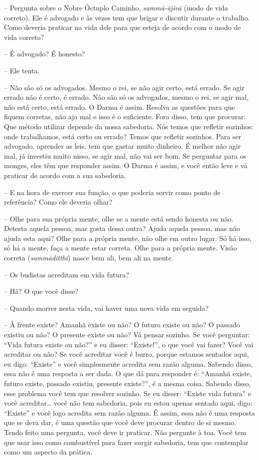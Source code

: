 -- Pergunta sobre o Nobre Óctuplo Caminho,
\textit{sammā-ājivā} (modo de vida correto). Ele é advogado e às
vezes tem que brigar e discutir durante o trabalho. Como deveria
praticar na vida dele para que esteja de acordo com o modo de vida
correto?

-- É advogado? É honesto?

-- Ele tenta.

-- Não são só os advogados. Mesmo o rei, se não agir certo, está
errado. Se agir errado não é certo, é errado. Não são só os advogados,
mesmo o rei, se agir mal, não está certo, está errado. O Darma é assim.
Resolva as questões para que fiquem corretas, não aja mal e isso é o
suficiente. Fora disso, tem que procurar. Que método utilizar depende
da nossa sabedoria. Nós temos que refletir sozinhos: onde trabalhamos,
está certo ou errado? Temos que refletir sozinhos. Para ser advogado,
aprender as leis, tem que gastar muito dinheiro. É melhor não agir mal,
já investiu muito nisso, se agir mal, não vai ser bom. Se perguntar
para os monges, eles têm que responder assim. O Darma é assim, e você
então leve e vá praticar de acordo com a sua sabedoria.

-- E na hora de exercer sua função, o que poderia servir como ponto
de referência? Como ele deveria olhar?

-- Olhe para sua própria mente, olhe se a mente está sendo honesta
ou não. Detesta aquela pessoa, mas gosta dessa outra? Ajuda aquela
pessoa, mas não ajuda esta aqui? Olhe para a própria mente, não olhe em
outro lugar. Só há isso, só há a mente, faça a mente estar correta.
Olhe para a própria mente. Visão correta (\textit{sammāditthi}) nasce
bem ali, bem ali na mente.

-- Os budistas acreditam em vida futura?

-- Hã? O que você disse? 

-- Quando morrer nesta vida, vai haver uma nova vida em seguida?

-- À frente existe? Amanhã existe ou não? O futuro existe ou não? O
passado existiu ou não? O presente existe ou não? Vá pensar sozinho. Se
você perguntar: “Vida futura existe ou não?” e eu disser: “Existe!”, o
que você vai fazer? Você vai acreditar ou não? Se você acreditar você é
burro, porque estamos sentados aqui, eu digo: “Existe” e você
simplesmente acredita sem razão alguma. Sabendo disso, essa não é uma
resposta a ser dada. O que dá para responder é: “Amanhã existe, futuro
existe, passado existiu, presente existe?”, é a mesma coisa. Sabendo
disso, esse problema você tem que resolver sozinho. Se eu disser:
“Existe vida futura” e você acreditar… você não tem sabedoria, pois eu
estou apenas sentado aqui, digo: “Existe” e você logo acredita sem
razão alguma. É assim, essa não é uma resposta que se deva dar, é uma
questão que você deve procurar dentro de si mesmo. Tendo feito uma
pergunta, você deve ir praticar. Não pergunte à toa. Você tem que usar
isso como combustível para fazer surgir sabedoria, tem que contemplar
como um aspecto da prática.

